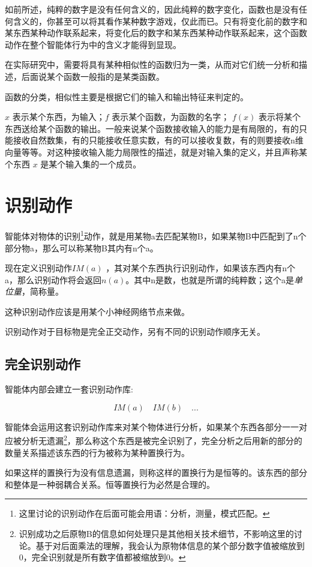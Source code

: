 \documentclass[12pt,oneside]{book}
\begin{document}
如前所述，纯粹的数字是没有任何含义的，因此纯粹的数字变化，函数也是没有任何含义的，你甚至可以将其看作某种数字游戏，仅此而已。只有将变化前的数字和某东西某种动作联系起来，将变化后的数字和某东西某种动作联系起来，这个函数动作在整个智能体行为中的含义才能得到显现。

在实际研究中，需要将具有某种相似性的函数归为一类，从而对它们统一分析和描述，后面说某个函数一般指的是某类函数。

函数的分类，相似性主要是根据它们的输入和输出特征来判定的。

$x$ 表示某个东西，为输入；$f$ 表示某个函数，为函数的名字； $f(x)$ 表示将某个东西送给某个函数的输出。一般来说某个函数接收输入的能力是有局限的，有的只能接收自然数集，有的只能接收任意实数，有的可以接收复数，有的则要接收n维向量等等。对这种接收输入能力局限性的描述，就是对输入集的定义，并且声称某个东西 $x$ 是某个输入集的一个成员。


\section{识别动作}
智能体对物体的识别\footnote{这里讨论的识别动作在后面可能会用语：分析，测量，模式匹配。}动作，就是用某物a去匹配某物B，如果某物B中匹配到了n个部分物a，那么可以称某物B其内有n个a。

现在定义识别动作$IM(a)$ ，其对某个东西执行识别动作，如果该东西内有n个a，那么识别动作将会返回$n(a)$。其中n是数，也就是所谓的纯粹数；这个a是\emph{单位量}，简称量。

这种识别动作应该是用某个小神经网络节点来做。

识别动作对于目标物是完全正交动作，另有不同的识别动作顺序无关。


\subsection{完全识别动作}
智能体内部会建立一套识别动作库: 

\[
IM(a) \quad IM(b) \quad ...
\]

智能体会运用这套识别动作库来对某个物体进行分析，如果某个东西各部分一一对应被分析无遗漏\footnote{识别成功之后原物B的信息如何处理只是其他相关技术细节，不影响这里的讨论。基于对后面乘法的理解，我会认为原物体信息的某个部分数字值被缩放到0，完全识别就是所有数字值都被缩放到0。}，那么称这个东西是被完全识别了，完全分析之后用新的部分的数量关系描述该东西的行为被称为某种置换行为。

如果这样的置换行为没有信息遗漏，则称这样的置换行为是恒等的。该东西的部分和整体是一种弱耦合关系。恒等置换行为必然是合理的。
\end{document}
